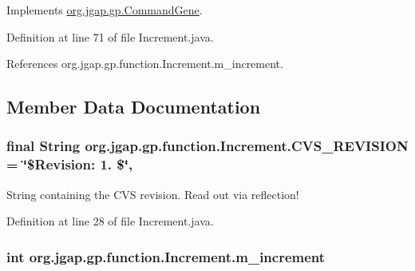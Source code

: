 Implements \hyperlink{classorg_1_1jgap_1_1gp_1_1_command_gene_a236141d99059da808afe7a9217e411c7}{org.\-jgap.\-gp.\-Command\-Gene}.



Definition at line 71 of file Increment.\-java.



References org.\-jgap.\-gp.\-function.\-Increment.\-m\-\_\-increment.



\subsection{Member Data Documentation}
\hypertarget{classorg_1_1jgap_1_1gp_1_1function_1_1_increment_af2a26cc6611b9772fa2a98c939a5b865}{
\subsubsection[{C\-V\-S\-\_\-\-R\-E\-V\-I\-S\-I\-O\-N}]{\setlength{\rightskip}{0pt plus 5cm}final String org.\-jgap.\-gp.\-function.\-Increment.\-C\-V\-S\-\_\-\-R\-E\-V\-I\-S\-I\-O\-N = \char`\"{}\$Revision\-: 1. \$\char`\"{}\hspace{0.3cm}{\ttfamily [static]}, {\ttfamily [private]}}}\label{classorg_1_1jgap_1_1gp_1_1function_1_1_increment_af2a26cc6611b9772fa2a98c939a5b865}
String containing the C\-V\-S revision. Read out via reflection! 

Definition at line 28 of file Increment.\-java.

\hypertarget{classorg_1_1jgap_1_1gp_1_1function_1_1_increment_ae6c774213dc5c66a1c6335b8815cfd2d}{
\subsubsection[{m\-\_\-increment}]{\setlength{\rightskip}{0pt plus 5cm}int org.\-jgap.\-gp.\-function.\-Increment.\-m\-\_\-increment\hspace{0.3cm}{\ttfamily [private]}}}\label{classorg_1_1jgap_1_1gp_1_1function_1_1_increment_ae6c774213dc5c66a1c6335b8815cfd2d}


